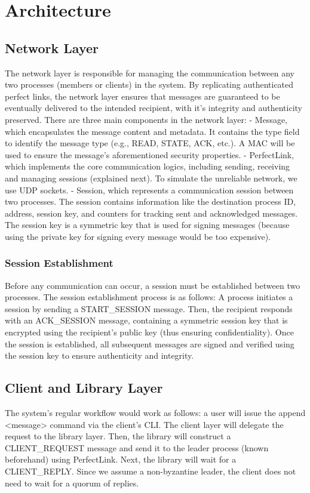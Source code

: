 \documentclass[runningheads]{llncs}
\begin{document}
\section{Architecture}
\subsection{Network Layer}
The network layer is responsible for managing the communication between any two
processes (members or clients) in the system. By replicating authenticated
perfect links, the network layer ensures that messages are guaranteed to be
eventually delivered to the intended recipient, with it's integrity and
authenticity preserved. There are three main components in the network layer: 
%
- Message, which encapsulates the message content and metadata. It contains the
type field to identify the message type (e.g., READ, STATE, ACK, etc.). A MAC will
be used to ensure the message's aforementioned security properties.
%
- PerfectLink, which implements the core communication logics, including
sending, receiving and managing sessions (explained next). To simulate the
unreliable network, we use UDP sockets. 
%
- Session, which represents a communication session between two processes. The
session contains information like the destination process ID, address, session
key, and counters for tracking sent and acknowledged messages. The session key
is a symmetric key that is used for signing messages (because using the private key for
signing every message would be too expensive).
%
\subsubsection{Session Establishment}

Before any communication can occur, a session must be established between two
processes. The session establishment process is as follows: A process initiates
a session by sending a START\_SESSION message. Then, the recipient responds with an
ACK\_SESSION message, containing a symmetric session key that is encrypted using the recipient's public key (thus ensuring confidentiality). Once the session is
established, all subsequent messages are signed and verified using the session
key to ensure authenticity and integrity.
%
\subsection{Client and Library Layer}
The system's regular workflow would work as follows: a user will issue the append <message> command via the client's CLI. The client
layer will delegate the request to the library layer. Then, the library will
construct a CLIENT\_REQUEST message and send it to the leader process (known
beforehand) using PerfectLink. Next, the library will wait for a CLIENT\_REPLY.
Since we assume a non-byzantine leader, the client does not need to 
wait for a quorum of replies.
\end{document}

